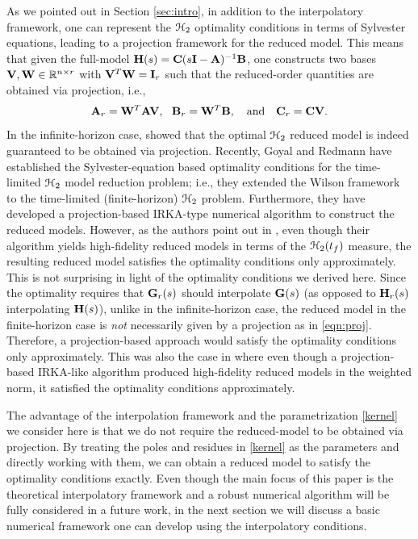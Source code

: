 \documentclass[twocolumn]{autart}
\begin{document}
As we pointed out in Section \ref{sec:intro}, in addition to the interpolatory framework, one can represent the $\EuScript{H}_2$ optimality conditions in terms of  Sylvester equations, leading to a projection framework for the reduced model. This means that given the full-model $\mathbf{H}(s) = \mathbf{C}(s\mathbf{I} - \mathbf{A})^{-1} \mathbf{B}$, one constructs two bases $\mathbf{V},\mathbf{W} \in \mathbb{R}^{n\times r}$ with $\mathbf{V}^T\mathbf{W} = \mathbf{I}_r$ such that the reduced-order quantities are obtained via projection, i.e.,
\begin{equation} \label{eqn:proj}
\mathbf{A}_r = \mathbf{W}^T \mathbf{A} \mathbf{V},~~\mathbf{B}_r = \mathbf{W}^T \mathbf{B}, \quad \mbox{and}\quad \mathbf{C}_r = \mathbf{C} \mathbf{V}.
\end{equation}
In the infinite-horizon case, \cite{Wil70} showed that the optimal $\EuScript{H}_2$ reduced model is indeed guaranteed to be obtained via projection. Recently, Goyal and Redmann  \cite{GoyR17} have established the Sylvester-equation based optimality conditions for the time-limited $\EuScript{H}_2$ model reduction problem; i.e., they extended the Wilson framework to the time-limited (finite-horizon) $\EuScript{H}_2$ problem. Furthermore, they have developed a projection-based IRKA-type numerical algorithm to construct the reduced models. However, as the authors point out in \cite{GoyR17}, even though their algorithm yields high-fidelity reduced models in terms of the $\EuScript{H}_2(t_f)$ measure, the resulting reduced model  satisfies the optimality conditions only approximately. This is not surprising in light of the optimality conditions we derived here. Since the optimality requires that $\mathbf{G}_r(s)$ should interpolate $\mathbf{G}(s)$ (as opposed to $\mathbf{H}_r(s)$ interpolating $\mathbf{H}(s)$), unlike in the infinite-horizon case, the reduced model in the finite-horizon case is \emph{not} necessarily given by a projection  as in \eqref{eqn:proj}. Therefore, a projection-based approach would satisfy the optimality conditions only approximately. This was also the case in  \cite{breiten2013near} where even though a projection-based IRKA-like algorithm produced high-fidelity reduced models in the weighted norm,  it satisfied the optimality conditions approximately. 

The advantage of the interpolation framework and the parametrization \eqref{kernel} we consider here is that
we do not require the reduced-model to be obtained via projection. By treating the poles and residues in \eqref{kernel} as the parameters and directly working with them, we can obtain a reduced model to satisfy the optimality conditions exactly. Even though the main focus of this paper is the theoretical interpolatory framework  and a robust numerical algorithm will be  fully considered in a future work, in the next section we will  discuss a basic numerical framework one can develop using the interpolatory conditions.
\end{document}
